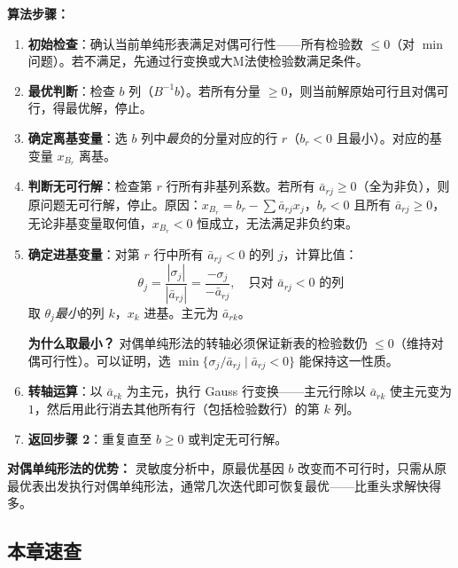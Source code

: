 \medskip
\textbf{算法步骤：}
\begin{enumerate}
  \item \textbf{初始检查}：确认当前单纯形表满足对偶可行性——所有检验数 $\le 0$（对 $\min$ 问题）。若不满足，先通过行变换或大M法使检验数满足条件。
  \item \textbf{最优判断}：检查 $b$ 列（$B^{-1}b$）。若所有分量 $\ge 0$，则当前解原始可行且对偶可行，得最优解，停止。
  \item \textbf{确定离基变量}：选 $b$ 列中\emph{最负}的分量对应的行 $r$（$b_r < 0$ 且最小）。对应的基变量 $x_{B_r}$ 离基。
  \item \textbf{判断无可行解}：检查第 $r$ 行所有非基列系数。若所有 $\bar{a}_{rj} \ge 0$（全为非负），则原问题无可行解，停止。原因：$x_{B_r} = b_r - \sum\bar{a}_{rj}x_j$，$b_r<0$ 且所有 $\bar{a}_{rj}\ge0$，无论非基变量取何值，$x_{B_r} < 0$ 恒成立，无法满足非负约束。
  \item \textbf{确定进基变量}：对第 $r$ 行中所有 $\bar{a}_{rj} < 0$ 的列 $j$，计算比值：
  \[
  \theta_j = \frac{|\sigma_j|}{|\bar{a}_{rj}|} = \frac{-\sigma_j}{-\bar{a}_{rj}},\quad \text{只对 } \bar{a}_{rj} < 0 \text{ 的列}
  \]
  取 $\theta_j$\emph{最小}的列 $k$，$x_k$ 进基。主元为 $\bar{a}_{rk}$。

  \textbf{为什么取最小？} 对偶单纯形法的转轴必须保证新表的检验数仍 $\le 0$（维持对偶可行性）。可以证明，选 $\min\{\sigma_j/\bar{a}_{rj} \mid \bar{a}_{rj}<0\}$ 能保持这一性质。
  \item \textbf{转轴运算}：以 $\bar{a}_{rk}$ 为主元，执行 Gauss 行变换——主元行除以 $\bar{a}_{rk}$ 使主元变为 $1$，然后用此行消去其他所有行（包括检验数行）的第 $k$ 列。
  \item \textbf{返回步骤 2}：重复直至 $b \ge 0$ 或判定无可行解。
\end{enumerate}

\medskip
\textbf{对偶单纯形法的优势：} 灵敏度分析中，原最优基因 $b$ 改变而不可行时，只需从原最优表出发执行对偶单纯形法，通常几次迭代即可恢复最优——比重头求解快得多。

\subsection{本章速查}

